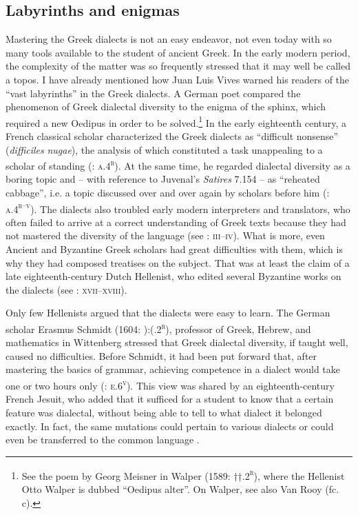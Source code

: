 \documentclass[output=paper]{langsci/langscibook}
\begin{document}
\subsection{Labyrinths and enigmas}
\hypertarget{Toc19704824}{}
Mastering the Greek dialects is not an easy endeavor, not even today with so many tools available to the student of ancient Greek. In the early modern period, the complexity of the matter was so frequently stressed that it may well be called a topos. I have already mentioned how Juan Luis Vives warned his readers of the “vast labyrinths” in the Greek dialects. A German poet compared the phenomenon of Greek dialectal diversity to the enigma of the sphinx, which required a new Oedipus in order to be solved.\footnote{See the poem by Georg Meisner in Walper (1589: ††.2\textsc{\textsuperscript{r}}), where the Hellenist Otto Walper is dubbed “Oedipus alter”. On Walper, see also Van Rooy (fc. c).} In the early eighteenth century, a French classical scholar characterized the Greek dialects as “difficult nonsense” (\textit{difficiles} \textit{nugae}), the analysis of which constituted a task unappealing to a scholar of standing (\citealt{Maittaire1706}: \textsc{a.4}\textsc{\textsuperscript{r}}). At the same time, he regarded dialectal diversity as a boring topic and – with reference to Juvenal’s \textit{Satires} 7.154 – as “reheated cabbage”, i.e. a topic discussed over and over again by scholars before him (\citealt{Maittaire1706}: \textsc{a.4}\textsc{\textsuperscript{r–v}}). The dialects also troubled early modern interpreters and translators, who often failed to arrive at a correct understanding of Greek texts because they had not mastered the diversity of the language (see \citealt{Facius1782}: \textsc{iii–iv}). What is more, even Ancient and Byzantine Greek scholars had great difficulties with them, which is why they had composed treatises on the subject. That was at least the claim of a late eighteenth-century Dutch Hellenist, who edited several Byzantine works on the dialects (see \citealt{Koen1766}: \textsc{xvii–xviii}).

Only few Hellenists argued that the dialects were easy to learn. The German scholar Erasmus Schmidt (1604: ):(.2\textsc{\textsuperscript{r}}), professor of Greek, Hebrew, and mathematics in Wittenberg stressed that Greek dialectal diversity, if taught well, caused no difficulties. Before Schmidt, it had been put forward that, after mastering the basics of grammar, achieving competence in a dialect would take one or two hours only (\citealt{Caselius1560}: \textsc{e.6}\textsc{\textsuperscript{v}}). This view was shared by an eighteenth-century French Jesuit, who added that it sufficed for a student to know that a certain feature was dialectal, without being able to tell to what dialect it belonged exactly. In fact, the same mutations could pertain to various dialects or could even be transferred to the common language \citep[101]{Giraudeau1739}.
\end{document}
